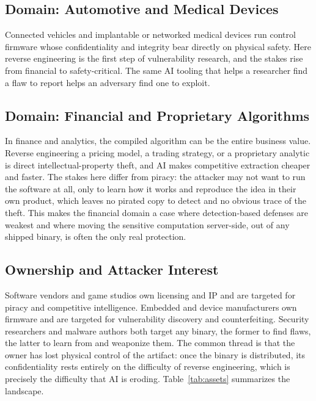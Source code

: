 \documentclass[conference]{IEEEtran}
\begin{document}
\subsection{Domain: Automotive and Medical Devices}
Connected vehicles and implantable or networked medical devices run control firmware
whose confidentiality and integrity bear directly on physical safety. Here reverse
engineering is the first step of vulnerability research, and the stakes rise from
financial to safety-critical. The same AI tooling that helps a researcher find a
flaw to report helps an adversary find one to exploit.

\subsection{Domain: Financial and Proprietary Algorithms}
In finance and analytics, the compiled algorithm can be the entire business value.
Reverse engineering a pricing model, a trading strategy, or a proprietary analytic
is direct intellectual-property theft, and AI makes competitive extraction cheaper
and faster. The stakes here differ from piracy: the attacker may not want to run the
software at all, only to learn how it works and reproduce the idea in their own
product, which leaves no pirated copy to detect and no obvious trace of the theft.
This makes the financial domain a case where detection-based defenses are weakest
and where moving the sensitive computation server-side, out of any shipped binary,
is often the only real protection.

\subsection{Ownership and Attacker Interest}
Software vendors and game studios own licensing and IP and are targeted for piracy
and competitive intelligence. Embedded and device manufacturers own firmware and
are targeted for vulnerability discovery and counterfeiting. Security researchers
and malware authors both target any binary, the former to find flaws, the latter to
learn from and weaponize them. The common thread is that the owner has lost physical
control of the artifact: once the binary is distributed, its confidentiality rests
entirely on the difficulty of reverse engineering, which is precisely the difficulty
that AI is eroding. Table~\ref{tab:assets} summarizes the landscape.
\end{document}
